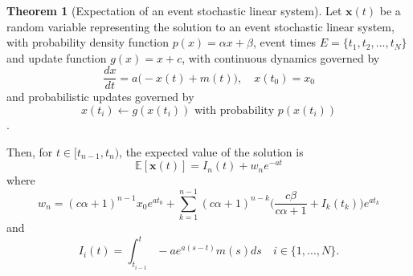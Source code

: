 \documentclass{journal}
\theoremstyle{definition}
\newtheorem{theorem}{Theorem}
\begin{document}
\begin{theorem}[Expectation of an event stochastic linear system] \label{thm:expectation}
Let $\mathbf{x}(t)$ be a random variable representing the solution to an event stochastic linear system, with probability density function $p(x) = \alpha x + \beta$, event times $E = \{t_1, t_2, ..., t_N\}$ and update function $g(x) = x + c$, with continuous dynamics governed by
\begin{equation*}
\frac{dx}{dt} = a\big( -x(t) + m(t) \big), \quad x(t_0) = x_0
\end{equation*}
and probabilistic updates governed by
\begin{equation*}
x(t_i) \leftarrow g(x(t_i)) \text{ with probability } p(x(t_i))
\end{equation*}.

Then, for $t \in [t_{n-1}, t_n)$, the expected value of the solution is 
\begin{equation} \label{equ:piece_sol}
 \mathbb{E}[\mathbf{x}(t)] = I_n(t) + w_ne^{-at}
\end{equation}
where 
\begin{equation} \label{equ:exp_weights}
w_n = (c\alpha + 1)^{n-1} x_0 e^{at_0} + \sum_{k=1}^{n-1} (c\alpha +1)^{n-k}\big(\frac{c\beta}{c\alpha +1} + I_{k}(t_{k})\big)e^{at_{k}} 
\end{equation}
and
\[
I_i(t) = \int_{t_{i-1}}^t -ae^{a(s-t)}m(s)ds \quad i \in \{1, ..., N \}.
\]
\end{theorem}
\end{document}
